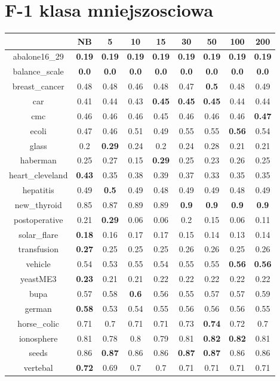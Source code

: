 \documentclass{article}%
\begin{document}
%
\section*{F{-}1 klasa mniejszosciowa}%
\begin{tabular}{c|cccccccc}%
\hline%
&NB&5&10&15&30&50&100&200\\%
\hline%
abalone16\_29&\textbf{0.19}&\textbf{0.19}&\textbf{0.19}&\textbf{0.19}&\textbf{0.19}&\textbf{0.19}&\textbf{0.19}&\textbf{0.19}\\%
\hline%
balance\_scale&\textbf{0.0}&\textbf{0.0}&\textbf{0.0}&\textbf{0.0}&\textbf{0.0}&\textbf{0.0}&\textbf{0.0}&\textbf{0.0}\\%
\hline%
breast\_cancer&0.48&0.48&0.46&0.48&0.47&\textbf{0.5}&0.48&0.49\\%
\hline%
car&0.41&0.44&0.43&\textbf{0.45}&\textbf{0.45}&\textbf{0.45}&0.44&0.44\\%
\hline%
cmc&0.46&0.46&0.46&0.45&0.46&0.46&0.46&\textbf{0.47}\\%
\hline%
ecoli&0.47&0.46&0.51&0.49&0.55&0.55&\textbf{0.56}&0.54\\%
\hline%
glass&0.2&\textbf{0.29}&0.24&0.2&0.24&0.28&0.21&0.21\\%
\hline%
haberman&0.25&0.27&0.15&\textbf{0.29}&0.25&0.23&0.26&0.25\\%
\hline%
heart\_cleveland&\textbf{0.43}&0.35&0.38&0.39&0.37&0.33&0.35&0.35\\%
\hline%
hepatitis&0.49&\textbf{0.5}&0.49&0.48&0.49&0.49&0.48&0.49\\%
\hline%
new\_thyroid&0.85&0.87&0.89&0.89&\textbf{0.9}&\textbf{0.9}&\textbf{0.9}&\textbf{0.9}\\%
\hline%
postoperative&0.21&\textbf{0.29}&0.06&0.06&0.2&0.15&0.06&0.11\\%
\hline%
solar\_flare&\textbf{0.18}&0.16&0.17&0.17&0.15&0.14&0.13&0.14\\%
\hline%
transfusion&\textbf{0.27}&0.25&0.25&0.25&0.26&0.26&0.25&0.26\\%
\hline%
vehicle&0.54&0.53&0.55&0.54&0.55&0.55&\textbf{0.56}&\textbf{0.56}\\%
\hline%
yeastME3&\textbf{0.23}&0.21&0.21&0.22&0.22&0.22&0.22&0.22\\%
\hline%
bupa&0.57&0.58&\textbf{0.6}&0.56&0.55&0.57&0.57&0.59\\%
\hline%
german&\textbf{0.58}&0.53&0.54&0.55&0.56&0.56&0.56&0.55\\%
\hline%
horse\_colic&0.71&0.7&0.71&0.71&0.73&\textbf{0.74}&0.72&0.7\\%
\hline%
ionosphere&0.81&0.78&0.8&0.79&0.81&\textbf{0.82}&\textbf{0.82}&0.81\\%
\hline%
seeds&0.86&\textbf{0.87}&0.86&0.86&\textbf{0.87}&\textbf{0.87}&0.86&0.86\\%
\hline%
vertebal&\textbf{0.72}&0.69&0.7&0.7&0.71&0.71&0.71&0.71\\%
\hline%
\end{tabular}
\end{document}
